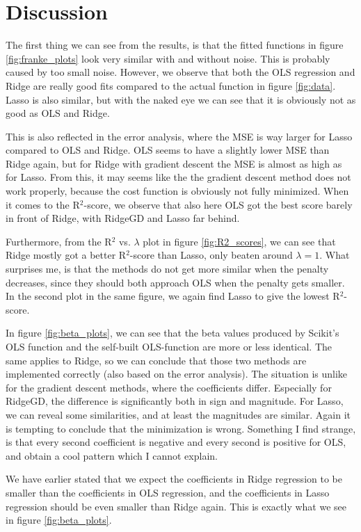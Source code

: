 \section{Discussion} \label{sec:discussion}
The first thing we can see from the results, is that the fitted functions in figure \eqref{fig:franke_plots} look very similar with and without noise. This is probably caused by too small noise. However, we observe that both the OLS regression and Ridge are really good fits compared to the actual function in figure \eqref{fig:data}. Lasso is also similar, but with the naked eye we can see that it is obviously not as good as OLS and Ridge. 

This is also reflected in the error analysis, where the MSE is way larger for Lasso compared to OLS and Ridge. OLS seems to have a slightly lower MSE than Ridge again, but for Ridge with gradient descent the MSE is almost as high as for Lasso. From this, it may seems like the the gradient descent method does not work properly, because the cost function is obviously not fully minimized. When it comes to the R$^2$-score, we observe that also here OLS got the best score barely in front of Ridge, with RidgeGD and Lasso far behind. 

Furthermore, from the R$^2$ vs. $\lambda$ plot in figure \eqref{fig:R2_scores}, we can see that Ridge mostly got a better R$^2$-score than Lasso, only beaten around $\lambda=1$. What surprises me, is that the methods do not get more similar when the penalty decreases, since they should both approach OLS when the penalty gets smaller. In the second plot in the same figure, we again find Lasso to give the lowest R$^2$-score. 

In figure \eqref{fig:beta_plots}, we can see that the beta values produced by Scikit's OLS function and the self-built OLS-function are more or less identical. The same applies to Ridge, so we can conclude that those two methods are implemented correctly (also based on the error analysis). The situation is unlike for the gradient descent methods, where the coefficients differ. Especially for RidgeGD, the difference is significantly both in sign and magnitude. For Lasso, we can reveal some similarities, and at least the magnitudes are similar. Again it is tempting to conclude that the minimization is wrong. Something I find strange, is that every second coefficient is negative and every second is positive for OLS, and obtain a cool pattern which I cannot explain. 

We have earlier stated that we expect the coefficients in Ridge regression to be smaller than the coefficients in OLS regression, and the coefficients in Lasso regression should be even smaller than Ridge again. This is exactly what we see in figure \eqref{fig:beta_plots}.
\vspace{1cm}

